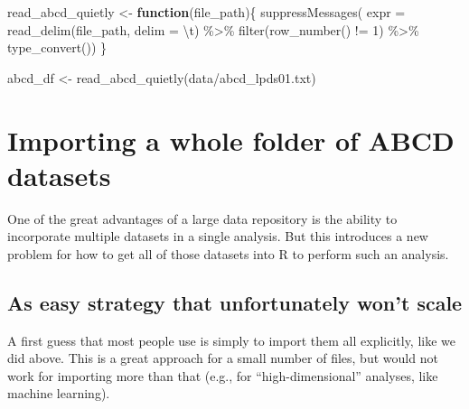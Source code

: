 \documentclass[
]{book}
\newenvironment{Shaded}{\begin{snugshade}}{\end{snugshade}}
\newcommand{\AttributeTok}[1]{\textcolor[rgb]{0.77,0.63,0.00}{#1}}
\newcommand{\ControlFlowTok}[1]{\textcolor[rgb]{0.13,0.29,0.53}{\textbf{#1}}}
\newcommand{\DecValTok}[1]{\textcolor[rgb]{0.00,0.00,0.81}{#1}}
\newcommand{\FunctionTok}[1]{\textcolor[rgb]{0.00,0.00,0.00}{#1}}
\newcommand{\NormalTok}[1]{#1}
\newcommand{\OtherTok}[1]{\textcolor[rgb]{0.56,0.35,0.01}{#1}}
\newcommand{\SpecialCharTok}[1]{\textcolor[rgb]{0.00,0.00,0.00}{#1}}
\newcommand{\StringTok}[1]{\textcolor[rgb]{0.31,0.60,0.02}{#1}}
\begin{document}
\begin{Shaded}
\begin{Highlighting}[]
\NormalTok{read\_abcd\_quietly }\OtherTok{\textless{}{-}} \ControlFlowTok{function}\NormalTok{(file\_path)\{}
  \FunctionTok{suppressMessages}\NormalTok{(}
    \AttributeTok{expr =} \FunctionTok{read\_delim}\NormalTok{(file\_path, }\AttributeTok{delim =} \StringTok{\textquotesingle{}}\SpecialCharTok{\textbackslash{}t}\StringTok{\textquotesingle{}}\NormalTok{) }\SpecialCharTok{\%\textgreater{}\%} 
      \FunctionTok{filter}\NormalTok{(}\FunctionTok{row\_number}\NormalTok{() }\SpecialCharTok{!=} \DecValTok{1}\NormalTok{) }\SpecialCharTok{\%\textgreater{}\%} 
      \FunctionTok{type\_convert}\NormalTok{())}
\NormalTok{\}}

\NormalTok{abcd\_df }\OtherTok{\textless{}{-}} \FunctionTok{read\_abcd\_quietly}\NormalTok{(}\StringTok{\textquotesingle{}data/abcd\_lpds01.txt\textquotesingle{}}\NormalTok{)}
\end{Highlighting}
\end{Shaded}

\hypertarget{importing-a-whole-folder-of-abcd-datasets}{%
\section{Importing a whole folder of ABCD datasets}\label{importing-a-whole-folder-of-abcd-datasets}}

One of the great advantages of a large data repository is the ability to incorporate multiple datasets in a single analysis. But this introduces a new problem for how to get all of those datasets into R to perform such an analysis.

\hypertarget{as-easy-strategy-that-unfortunately-wont-scale}{%
\subsection{As easy strategy that unfortunately won't scale}\label{as-easy-strategy-that-unfortunately-wont-scale}}

A first guess that most people use is simply to import them all explicitly, like we did above. This is a great approach for a small number of files, but would not work for importing more than that (e.g., for ``high-dimensional'' analyses, like machine learning).
\end{document}

